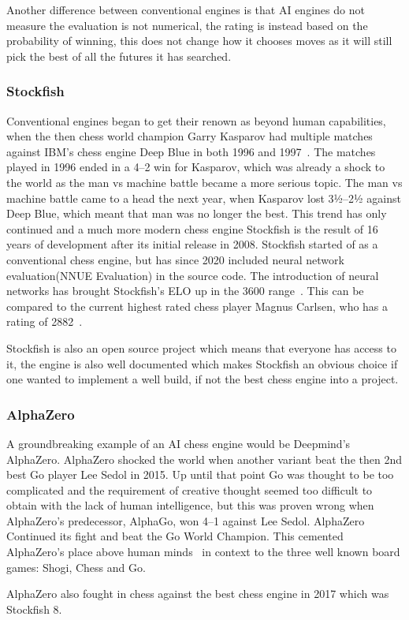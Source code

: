 Another difference between conventional engines is that AI engines do not measure the evaluation is not numerical, the
rating is instead based on the probability of winning, this does not change how it chooses moves as it will still pick
the best of all the futures it has searched.

\subsubsection{Stockfish}\label{subsubsec:stockfish}

Conventional engines began to get their renown as beyond human capabilities, when the then chess world champion
Garry Kasparov had multiple matches against IBM's chess engine Deep Blue in both 1996 and
1997~\cite{Garry-Kasparov-vs-Deep-Blue}.
The matches played in 1996 ended in a 4--2 win for Kasparov, which was already a shock to the world as the man vs
machine battle became a more serious topic.
The man vs machine battle came to a head the next year, when Kasparov lost 3½--2½ against Deep Blue, which meant that
man was no longer the best.
This trend has only continued and a much more modern chess engine Stockfish is the result of 16 years of development
after its initial release in 2008.
Stockfish started of as a conventional chess engine, but has since 2020 included neural network
evaluation(NNUE Evaluation) in the source code.
The introduction of neural networks has brought Stockfish's ELO up in the 3600 range~\cite{Stockfish}.
This can be compared to the current highest rated chess player Magnus Carlsen, who has a
rating of 2882~\cite{highest-ELO-chess-player}.

Stockfish is also an open source project which means that everyone has access to it, the engine is also well documented
which makes Stockfish an obvious choice if one wanted to implement a well build, if not the best chess engine into a
project.
\subsubsection{AlphaZero}\label{subsubsec:alphazero}
A groundbreaking example of an AI chess engine would be Deepmind's AlphaZero.
AlphaZero shocked the world when another variant beat the then 2nd best Go player Lee Sedol in 2015.
Up until that point Go was thought to be too complicated and the requirement of creative thought seemed too difficult
to obtain with the lack of human intelligence, but this was proven wrong when AlphaZero's predecessor, AlphaGo,
won 4--1 against Lee Sedol.
AlphaZero Continued its fight and beat the Go World Champion.
This cemented AlphaZero's place above human minds~\cite{alpha-go-zero} in context to the three well known board games:
Shogi, Chess and Go.

AlphaZero also fought in chess against the best chess engine in 2017 which was Stockfish 8.
